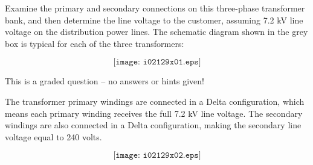 

Examine the primary and secondary connections on this three-phase transformer bank, and then determine the line voltage to the customer, assuming 7.2 kV line voltage on the distribution power lines.  The schematic diagram shown in the grey box is typical for each of the three transformers:

$$\texttt{[image: i02129x01.eps]}$$

\vfil 

\eject






This is a graded question -- no answers or hints given!







The transformer primary windings are connected in a Delta configuration, which means each primary winding receives the full 7.2 kV line voltage.  The secondary windings are also connected in a Delta configuration, making the secondary line voltage equal to 240 volts.

$$\texttt{[image: i02129x02.eps]}$$





